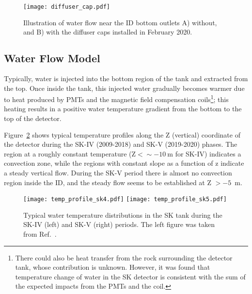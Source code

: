\documentclass[preprint,12pt]{elsarticle}
\begin{document}
\begin{figure}[htb]
\centering\texttt{[image: diffuser\_cap.pdf]}
\caption{Illustration of water flow near the ID bottom outlets A) without, and B) with the diffuser caps installed in February 2020.}
\label{fig:diffuser_cap}
\end{figure}

\subsection{Water Flow Model}

Typically, water is injected into the bottom region of the tank and extracted from the top. 
Once inside the tank, this injected water gradually becomes warmer due to heat produced by PMTs and the magnetic field compensation coils\footnote{There could also be heat transfer from the rock surrounding the detector tank, whose contribution is unknown. However, it was found that temperature change of water in the SK detector is consistent with the sum of the expected impacts from the PMTs and the coil.}; this heating results in a positive water temperature gradient from the bottom to the top of the detector. 

Figure~\ref{fig:SKtemp} shows typical temperature profiles along the Z (vertical) coordinate of the detector during the SK-IV (2009-2018) and SK-V (2019-2020) phases.
The region at a roughly constant temperature (Z$ < \sim -10~\mathrm{m}$ for SK-IV)
indicates a convection zone, while the regions with constant slope as
a function of z indicate a steady vertical flow.
During the SK-V period there is almost no convection region inside the ID,
and the steady flow seems to be established at Z $> -5$~m.



\begin{figure}[htb]
\begin{center}
\texttt{[image: temp\_profile\_sk4.pdf]}
\texttt{[image: temp\_profile\_sk5.pdf]}
\caption{
  Typical water temperature distributions in the SK tank
  during the SK-IV (left) and SK-V (right) periods.
  The left figure was taken from Ref.~\cite{Abe:2016nxk}.
}
\label{fig:SKtemp}
\end{center}
\end{figure}
\end{document}
